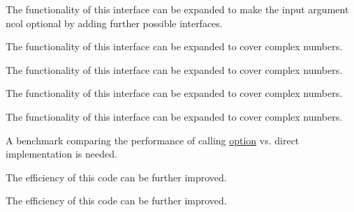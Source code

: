 \begin{DoxyRefList}
%
 The functionality of this interface can be expanded to make the input argument {\ttfamily ncol} optional by adding further possible interfaces. 
\item[Type \mbox{\hyperlink{interfaceMatrixSymmetry__mod_1_1genMatSymFromMatLow}{Matrix\+Symmetry\+\_\+mod\+::gen\+Mat\+Sym\+From\+Mat\+Low}} ]\label{todo__todo000061}%
%
 The functionality of this interface can be expanded to cover complex numbers. 
\item[Type \mbox{\hyperlink{interfaceMatrixSymmetry__mod_1_1genMatSymFromMatUpp}{Matrix\+Symmetry\+\_\+mod\+::gen\+Mat\+Sym\+From\+Mat\+Upp}} ]\label{todo__todo000060}%
%
 The functionality of this interface can be expanded to cover complex numbers. 
\item[Type \mbox{\hyperlink{interfaceMatrixSymmetry__mod_1_1symmetrizeMatLow}{Matrix\+Symmetry\+\_\+mod\+::symmetrize\+Mat\+Low}} ]\label{todo__todo000059}%
%
 The functionality of this interface can be expanded to cover complex numbers. 
\item[Type \mbox{\hyperlink{interfaceMatrixSymmetry__mod_1_1symmetrizeMatUpp}{Matrix\+Symmetry\+\_\+mod\+::symmetrize\+Mat\+Upp}} ]\label{todo__todo000058}%
%
 The functionality of this interface can be expanded to cover complex numbers. 
\item[Type \mbox{\hyperlink{interfaceOption__mod_1_1option}{Option\+\_\+mod\+::option}} ]\label{todo__todo000062}%
%
 A benchmark comparing the performance of calling \mbox{\hyperlink{interfaceOption__mod_1_1option}{option}} vs. direct implementation is needed. 
\item[Subprogram \mbox{\hyperlink{namespaceSample__mod_af9dafbc79f11fc37f384877e49f3bf27}{Sample\+\_\+mod\+::get\+Cho\+Low\+Cov\+Upp}} (nd, np, Mean, Sample, Cho\+Low\+Cov\+Upp, Cho\+Dia)]\label{todo__todo000066}%
%
 The efficiency of this code can be further improved. 
\item[Subprogram \mbox{\hyperlink{namespaceSample__mod_a1e5daab49859d9c21c4ec3c916ec963d}{Sample\+\_\+mod\+::get\+Cho\+Low\+Cov\+Upp\+High\+Dim}} (nd, np, Mean, Sample, Cho\+Low\+Cov\+Upp, Cho\+Dia)]\label{todo__todo000067}%
%
 The efficiency of this code can be further improved. 
\item[Subprogram \mbox{\hyperlink{namespaceSample__mod_ab6c8a951bf35c59402a30d6d17a6d193}{Sample\+\_\+mod\+::merge\+Mean\+Cov\+Upp}} (nd, npA, MeanA, Cov\+UppA, npB, MeanB, Cov\+UppB, Mean\+AB, Cov\+Upp\+AB)]\label{todo__todo000068}%

\end{DoxyRefList}
